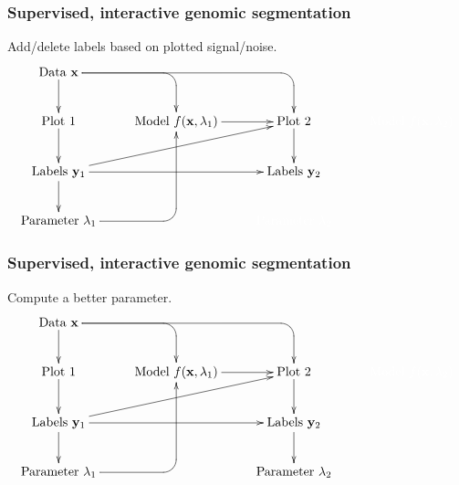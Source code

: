 \documentclass{beamer}
\begin{document}
\begin{frame}
  \frametitle{Supervised, interactive genomic segmentation}
  Add/delete labels based on plotted signal/noise.
  \small
  \begin{displaymath}
  \xymatrix{
    \text{Data $\mathbf x$}
    \ar `[r] [dr] 
    \ar `r[rr] [drr] 
    \ar [d]
    & \text{ }
    & \text{ }
    & \text{ }
    \\
    \text{Plot 1} 
    \ar [d]
    & 
    \text{Model $f(\mathbf x, \lambda_1)$} 
    \ar [r]
    &
    \text{Plot 2} 
    \ar [d]
    & 
    \color{white}{\text{Model $f(\mathbf x, \lambda_2)$} }
    \\
    \text{Labels $\mathbf y_1$}       
    \ar [d]
    \ar [rr]
    \ar [rru]
    &
    &
    \text{Labels $\mathbf y_2$}
    \\
    \text{Parameter $\lambda_1$} 
    \ar `r[ruu] [ruu]
    & \text{ }
    & 
    \color{white}{\text{Parameter $\lambda_2$}}
  }
  \end{displaymath}
\end{frame}

\begin{frame}
  \frametitle{Supervised, interactive genomic segmentation}
  Compute a better parameter.
  \small
  \begin{displaymath}
  \xymatrix{
    \text{Data $\mathbf x$}
    \ar `[r] [dr] 
    \ar `r[rr] [drr] 
    \ar [d]
    & \text{ }
    & \text{ }
    & \text{ }
    \\
    \text{Plot 1} 
    \ar [d]
    & 
    \text{Model $f(\mathbf x, \lambda_1)$} 
    \ar [r]
    &
    \text{Plot 2} 
    \ar [d]
    & 
    \color{white}{\text{Model $f(\mathbf x, \lambda_2)$} }
    \\
    \text{Labels $\mathbf y_1$}       
    \ar [d]
    \ar [rr]
    \ar [rru]
    &
    &
    \text{Labels $\mathbf y_2$}
    \ar [d]
    \\
    \text{Parameter $\lambda_1$} 
    \ar `r[ruu] [ruu]
    & \text{ }
    & \text{Parameter $\lambda_2$}
  }
  \end{displaymath}
\end{frame}
\end{document}
